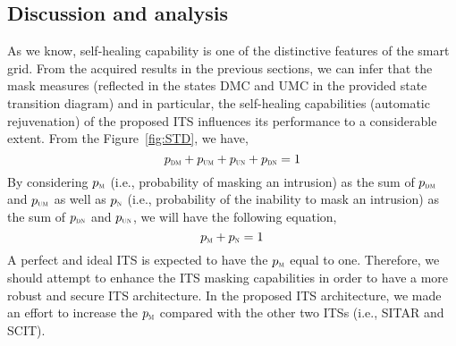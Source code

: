 \documentclass[preprint,number,12pt]{elsarticle}
\begin{document}
\subsection{Discussion and analysis}
As we know, self-healing capability is one of the distinctive features of the smart grid. From the acquired results in the previous sections, we can infer that the mask measures (reflected in the states DMC and UMC in the provided state transition diagram) and in particular, the self-healing capabilities (automatic rejuvenation) of the proposed ITS influences its performance to a considerable extent. From the Figure~\ref{fig:STD}, we have,
\begin{equation}  \label{eq: sum of probabilities}
p_{\scalebox{0.5}{DM}}+p_{\scalebox{0.5}{UM}}+p_{\scalebox{0.5}{UN}}+p_{\scalebox{0.5}{DN}}=1
\end{equation}
By considering $p_{\scalebox{0.5}{M}}$ (i.e., probability of masking an intrusion) as the sum of $p_{\scalebox{0.5}{DM}}$ and $p_{\scalebox{0.5}{UM}}$ as well as $p_{\scalebox{0.5}{N}}$ (i.e., probability of the inability to mask an intrusion) as the sum of $p_{\scalebox{0.5}{DN}}$ and $p_{\scalebox{0.5}{UN}}$, we will have the following equation,
\begin{equation}  \label{eq: sum of mask and non-mask probs}
p_{\scalebox{0.5}{M}}+p_{\scalebox{0.5}{N}}=1
\end{equation}
A perfect and ideal ITS is expected to have the $p_{\scalebox{0.5}{M}}$ equal to one. Therefore, we should attempt to enhance the ITS masking capabilities in order to have a more robust and secure ITS architecture. In the proposed ITS architecture, we made an effort to increase the $p_{\scalebox{0.5}{M}}$ compared with the other two ITSs (i.e., SITAR and SCIT).
\end{document}
